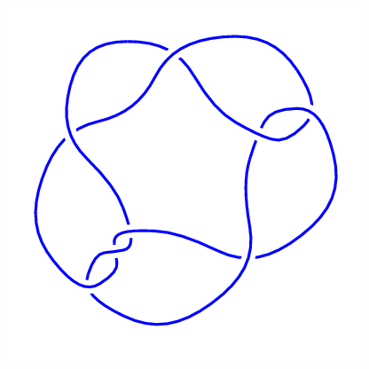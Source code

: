 \begin{figure}[H]
\begin{minipage}[b]{.18\linewidth}
	\end{minipage}
	\begin{minipage}[b]{.18\linewidth}
		\centering
		\includegraphics[width=\linewidth]{../data/8_6.png}
	\end{minipage}
\end{figure}
